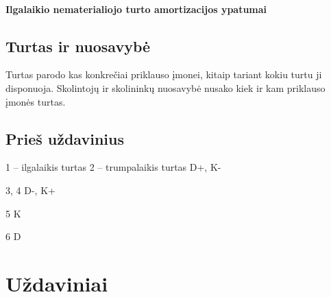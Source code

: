 \subsubsection{Ilgalaikio nematerialiojo turto amortizacijos ypatumai}



\section{Turtas ir nuosavybė}


Turtas parodo kas konkrečiai priklauso įmonei, kitaip tariant kokiu
turtu ji disponuoja. Skolintojų ir skolininkų nuosavybė nusako kiek ir
kam priklauso įmonės turtas.

\section{Prieš uždavinius}

1 – ilgalaikis turtas
2 – trumpalaikis turtas
D+, K-

3, 4
D-, K+

5
K

6
D

\chapter{Uždaviniai}

